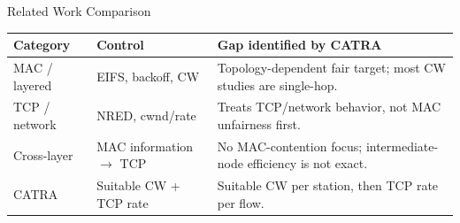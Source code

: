 \begin{frame}{Related Work Comparison}
\small
\begin{tabular}{>{\raggedright\arraybackslash}p{2.1cm}>{\raggedright\arraybackslash}p{3.3cm}>{\raggedright\arraybackslash}p{5.1cm}}
\toprule
\textbf{Category} & \textbf{Control} & \textbf{Gap identified by CATRA} \\
\midrule
MAC / layered & EIFS, backoff, CW & Topology-dependent fair target; most CW studies are single-hop. \\
TCP / network & NRED, cwnd/rate & Treats TCP/network behavior, not MAC unfairness first. \\
Cross-layer & MAC information $\rightarrow$ TCP & No MAC-contention focus; intermediate-node efficiency is not exact. \\
CATRA & Suitable CW + TCP rate & Suitable CW per station, then TCP rate per flow. \\
\bottomrule
\end{tabular}
\end{frame}
